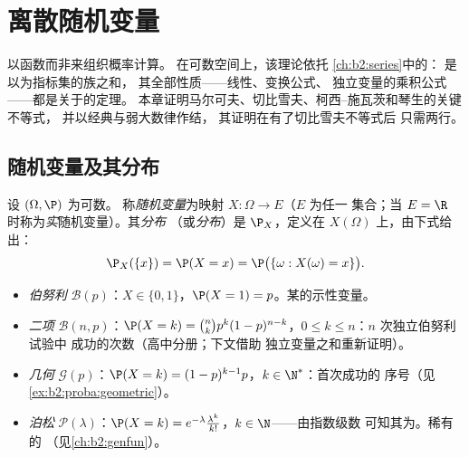 \chapter{离散随机变量}\label{ch:b2:randomvar}

以函数而非来组织概率计算。
在可数空间上，该理论依托
\cref{ch:b2:series}中的：
是以为指标集的族之和，
其全部性质——线性、变换公式、
独立变量的乘积公式——都是关于的定理。
本章证明马尔可夫、切比雪夫、柯西–施瓦茨和琴生的关键不等式，
并以经典与弱大数律作结，
其证明在有了切比雪夫不等式后
只需两行。

\section{随机变量及其分布}

\begin{definition}[离散随机变量；分布]\label{def:b2:randomvar:law}
设 $(\Omega, \P)$ 为可数。
称\emph{随机变量}为映射 $X \colon \Omega \to E$（$E$ 为任一
集合；当 $E = \R$ 时称为\emph{实}随机变量）。其\emph{分布}
（或\emph{分布}）是 $\P_X$，定义在
 $X(\Omega)$ 上，由下式给出：
\[
\P_X(\{x\}) = \P(X = x)
= \P\bigl(\{\omega : X(\omega) = x\}\bigr) .
\]
\end{definition}

\begin{example}[经典分布]\label{ex:b2:randomvar:laws}
\leavevmode
\begin{itemize}
\item \emph{伯努利} $\mathcal{B}(p)$：$X \in \{0, 1\}$，$\P(X =
1) = p$。某的示性变量。
\item \emph{二项} $\mathcal{B}(n, p)$：$\P(X = k) =
\binom nk p^k(1-p)^{n-k}$，$0 \leq k \leq n$：$n$ 次独立伯努利试验中
成功的次数（高中分册；下文借助
独立变量之和重新证明）。
\item \emph{几何} $\mathcal{G}(p)$：$\P(X = k) =
(1-p)^{k-1}p$，$k \in \N^*$：首次成功的
序号（见\cref{ex:b2:proba:geometric}）。
\item \emph{泊松} $\mathcal{P}(\lambda)$：$\P(X = k) =
e^{-\lambda}\frac{\lambda^k}{k!}$，$k \in \N$——由指数级数
可知其为。稀有的
（见\cref{ch:b2:genfun}）。
\end{itemize}
\end{example}


